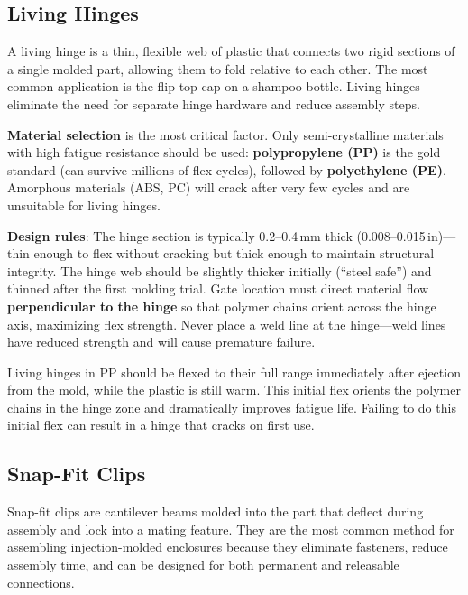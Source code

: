 \documentclass[11pt,letterpaper,twoside,openany]{book}
\begin{document}
\subsection{Living Hinges}
A living hinge is a thin, flexible web of plastic that connects two rigid sections of a single molded part, allowing them to fold relative to each other. The most common application is the flip-top cap on a shampoo bottle. Living hinges eliminate the need for separate hinge hardware and reduce assembly steps.

\textbf{Material selection} is the most critical factor. Only semi-crystalline materials with high fatigue resistance should be used: \textbf{polypropylene (PP)} is the gold standard (can survive millions of flex cycles), followed by \textbf{polyethylene (PE)}. Amorphous materials (ABS, PC) will crack after very few cycles and are unsuitable for living hinges.

\textbf{Design rules}: The hinge section is typically 0.2--0.4\,mm thick (0.008--0.015\,in)---thin enough to flex without cracking but thick enough to maintain structural integrity. The hinge web should be slightly thicker initially (``steel safe'') and thinned after the first molding trial. Gate location must direct material flow \textbf{perpendicular to the hinge} so that polymer chains orient across the hinge axis, maximizing flex strength. Never place a weld line at the hinge---weld lines have reduced strength and will cause premature failure.

\begin{warningbox}
Living hinges in PP should be flexed to their full range immediately after ejection from the mold, while the plastic is still warm. This initial flex orients the polymer chains in the hinge zone and dramatically improves fatigue life. Failing to do this initial flex can result in a hinge that cracks on first use.
\end{warningbox}

\subsection{Snap-Fit Clips}
Snap-fit clips are cantilever beams molded into the part that deflect during assembly and lock into a mating feature. They are the most common method for assembling injection-molded enclosures because they eliminate fasteners, reduce assembly time, and can be designed for both permanent and releasable connections.
\end{document}
